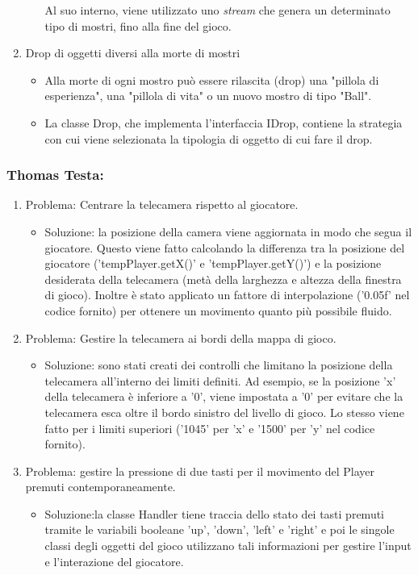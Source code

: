 \documentclass[a4paper,12pt]{report}
\begin{document}
\begin{enumerate}
\begin{itemize}
	Al suo interno, viene utilizzato uno \emph{stream} che genera un determinato tipo di mostri, fino alla fine del gioco. 
\end{itemize}
%
\item Drop di oggetti diversi alla morte di mostri
%
\begin{itemize}
	\item Alla morte di ogni mostro può essere rilascita (drop) una "pillola di esperienza", una "pillola di vita" o un nuovo mostro di tipo "Ball".
	\item La classe Drop, che implementa l'interfaccia IDrop, contiene la strategia con cui viene selezionata la tipologia di oggetto di cui fare il drop.
\end{itemize}

\end{enumerate}
%

\subsubsection*{Thomas Testa:}
%
\begin{enumerate}
	\item Problema: Centrare la telecamera rispetto al giocatore.
	\begin{itemize}
		\item  Soluzione: la posizione della camera viene aggiornata in modo che segua il giocatore. Questo viene fatto calcolando la differenza tra la posizione del giocatore ('tempPlayer.getX()' e 'tempPlayer.getY()') e la posizione desiderata della telecamera (metà della larghezza e altezza della finestra di gioco). 
		Inoltre è stato applicato un fattore di interpolazione ('0.05f' nel codice fornito) per ottenere un movimento quanto più possibile  fluido.
	\end{itemize}
	\item Problema: Gestire la telecamera ai bordi della mappa di gioco.
	\begin{itemize}
		\item Soluzione: sono stati creati dei controlli che limitano la posizione della telecamera all'interno dei limiti definiti. 
		Ad esempio, se la posizione 'x' della telecamera è inferiore a '0', viene impostata a '0' per evitare che la telecamera esca oltre il bordo sinistro del livello di gioco. Lo stesso viene fatto per i limiti superiori ('1045' per 'x' e '1500' per 'y' nel codice fornito).
	\end{itemize}
	\item Problema: gestire la pressione di due tasti per il movimento del Player premuti contemporaneamente.
	\begin{itemize}
		\item  Soluzione:la classe Handler tiene traccia dello stato dei tasti premuti tramite le variabili booleane 'up', 'down', 'left' e 'right' e poi le singole classi degli oggetti del gioco utilizzano tali informazioni per gestire l'input e l'interazione del giocatore.
	\end{itemize}
\end{enumerate}
%
\end{document}

